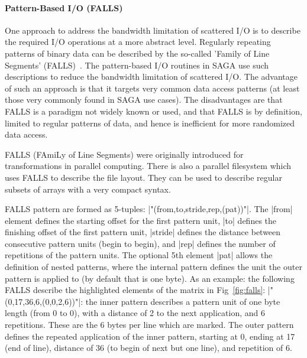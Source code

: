    \paragraph{Pattern-Based I/O (FALLS)}
   
   One approach to address the bandwidth limitation of scattered
   I/O is to describe the required I/O operations at a more
   abstract level.  Regularly repeating patterns of binary data
   can be described by the so-called 'Family of Line Segments'
   (FALLS)~\cite{falls}.  The pattern-based I/O routines in SAGA
   use such descriptions to reduce the bandwidth limitation of
   scattered I/O.  The advantage of such an approach is
   that it targets very common data access patterns (at least
   those very commonly found in SAGA use cases).  The
   disadvantages are that FALLS is a paradigm not widely known
   or used, and that FALLS is by definition, limited to regular
   patterns of data, and hence is inefficient for more
   randomized data access.
 
 
   FALLS (FAmiLy of Line Segments) were originally introduced
   for transformations in parallel computing. There is also a
   parallel filesystem which uses FALLS to describe the file
   layout. They can be used to describe regular subsets of
   arrays with a very compact syntax.  
   
   FALLS pattern are formed as 5-tuples:
   |"(from,to,stride,rep,(pat))"|.  The |from| element defines
   the starting offset for the first pattern unit, |to| defines
   the finishing offset of the first pattern unit, |stride|
   defines the distance between consecutive pattern units (begin
   to begin), and |rep| defines the number of repetitions of the
   pattern units.  The optional 5th element |pat| allows the
   definition of nested patterns, where the internal
   pattern defines the unit the outer pattern is applied to (by
   default that is one byte).  As an example: the following
   FALLS describe the highlighted elements of the matrix in
   Fig~\ref{fig:falls}: |"(0,17,36,6,(0,0,2,6))"|: the inner
   pattern describes a pattern unit of one byte length (from 0
   to 0), with a distance of 2 to the next application, and 6
   repetitions.  These are the 6 bytes per line which are
   marked.  The outer pattern defines the repeated
   application of the inner pattern, starting at 0, ending at 17
   (end of line), distance of 36 (to begin of next but one
   line), and repetition of 6.
 
